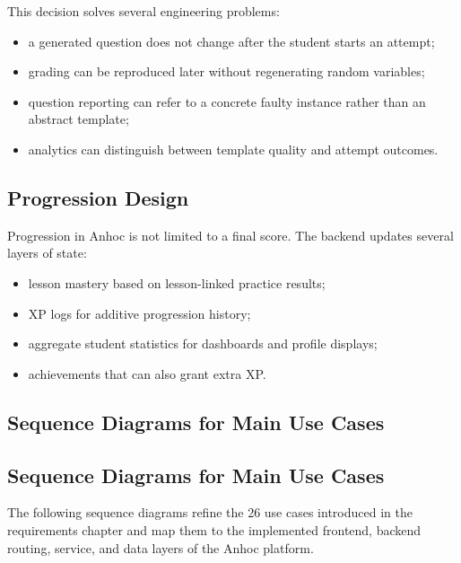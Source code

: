 This decision solves several engineering problems:
\begin{itemize}
  \item a generated question does not change after the student starts an attempt;
  \item grading can be reproduced later without regenerating random variables;
  \item question reporting can refer to a concrete faulty instance rather than an abstract template;
  \item analytics can distinguish between template quality and attempt outcomes.
\end{itemize}

\subsection{Progression Design}

Progression in Anhoc is not limited to a final score. The backend updates several layers of state:
\begin{itemize}
  \item lesson mastery based on lesson-linked practice results;
  \item XP logs for additive progression history;
  \item aggregate student statistics for dashboards and profile displays;
  \item achievements that can also grant extra XP.
\end{itemize}

\subsection{Sequence Diagrams for Main Use Cases}
\subsection{Sequence Diagrams for Main Use Cases}

The following sequence diagrams refine the 26 use cases introduced in the requirements chapter and map them to the implemented frontend, backend routing, service, and data layers of the Anhoc platform.


